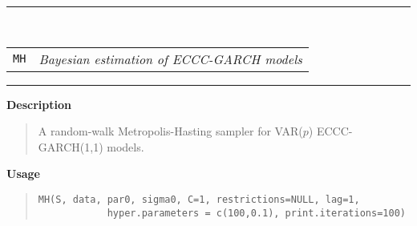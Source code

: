 \documentclass[final,3p,authoryear]{elsarticle}
\begin{document}

 























\newpage
%

\small
\bigskip
\begin{center}
\rule{15cm}{.1pt}\\

\bigskip\begin{tabular}{p{2cm} l}
\texttt{MH} & \textit{Bayesian estimation of ECCC-GARCH models} 
\end{tabular}

\smallskip
\rule{15cm}{.1pt}
\end{center}

\bigskip\noindent\textbf{Description}
\begin{quote}
A random-walk Metropolis-Hasting sampler for VAR($p$) ECCC-GARCH(1,1) models.
\end{quote}


\bigskip\noindent\textbf{Usage}
\begin{quote}
\begin{verbatim}
MH(S, data, par0, sigma0, C=1, restrictions=NULL, lag=1,
            hyper.parameters = c(100,0.1), print.iterations=100)
\end{verbatim}
\end{quote}
\end{document}

